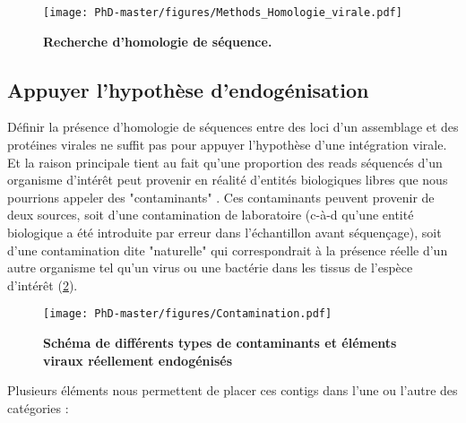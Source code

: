 \begin{figure}[!htpb]
\captionsetup{font=footnotesize}
 \centering
  \texttt{[image: PhD-master/figures/Methods\_Homologie\_virale.pdf]}
\caption[Methode:Schéma de recherche d'homologie de séquence]{\textbf{Recherche d'homologie de séquence.}}
\label{figure:Methods_Homologie_virale}
\end{figure}

\subsection{Appuyer l'hypothèse d'endogénisation}

Définir la présence d'homologie de séquences entre des loci d'un assemblage et des protéines virales ne suffit pas pour appuyer l'hypothèse d'une intégration virale. Et la raison principale tient au fait qu'une proportion des reads séquencés d'un organisme d'intérêt peut provenir en réalité d'entités biologiques libres que nous pourrions appeler des "contaminants" \citep{steinegger_terminating_2020}. Ces contaminants peuvent provenir de deux sources, soit d'une contamination de laboratoire (c-à-d qu'une entité biologique a été introduite par erreur dans l'échantillon avant séquençage), soit d'une contamination dite "naturelle" qui correspondrait à la présence réelle d'un autre organisme tel qu'un virus ou une bactérie dans les tissus de l'espèce d'intérêt (\figurename{\ref{figure:Contamination}}). 

\begin{figure}[!htpb]
\captionsetup{font=footnotesize}
 \centering
  \texttt{[image: PhD-master/figures/Contamination.pdf]}
\caption[Methode:Schéma de différents types de contaminants et éléments viraux réellement endogénisés]{\textbf{Schéma de différents types de contaminants et éléments viraux réellement endogénisés}}
\label{figure:Contamination}
\end{figure}

Plusieurs éléments nous permettent de placer ces contigs dans l'une ou l'autre des catégories : 

